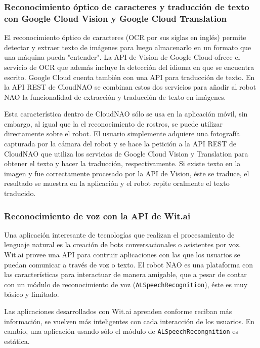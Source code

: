 \subsubsection{Reconocimiento óptico de caracteres y traducción de texto con Google Cloud Vision y Google Cloud Translation}

El reconocimiento óptico de caracteres (OCR por sus siglas en inglés) permite detectar y extraer texto de imágenes para luego
almacenarlo en un formato que una máquina pueda "entender".
La API de Vision de Google Cloud ofrece el servicio de OCR
que además incluye la detección del idioma en que se encuentra escrito.
Google Cloud cuenta también con una API para traducción de 
texto.
En la API REST de CloudNAO se combinan estos dos servicios
para añadir al robot NAO la funcionalidad de extracción y traducción de texto en imágenes. 

Esta característica dentro de CloudNAO sólo
se usa en la aplicación móvil, sin embargo, al igual que
la el reconocimiento de rostros, se puede utilizar directamente
sobre el robot. El usuario simplemente adquiere una fotografía
capturada por la cámara del robot y se hace la petición
a la API REST de CloudNAO que utiliza los servicios
de Google Cloud Vision y Translation para obtener el texto
y hacer la traducción, respectivamente.
Si existe texto en la imagen y fue correctamente procesado por
la API de Vision, éste se traduce, el resultado se muestra
en la aplicación y el robot repite oralmente
el texto traducido.

\subsubsection{Reconocimiento de voz con la API de Wit.ai}

Una aplicación interesante de tecnologías que realizan el 
procesamiento de lenguaje natural es la creación de bots conversacionales
o asistentes por voz. Wit.ai provee una API para contruir aplicaciones
con las que los usuarios se puedan comunicar a través de voz o texto.
El robot NAO es una plataforma con las características 
para interactuar de manera amigable, que a pesar de contar con un
módulo de reconocimiento de voz (\texttt{ALSpeechRecognition}), éste es muy 
básico y limitado.

Las aplicaciones desarrollados con Wit.ai aprenden conforme reciban más 
información, se vuelven más inteligentes con cada interacción de los usuarios.
En cambio, una aplicación usando sólo el módulo de \texttt{ALSpeechRecongnition} es estática.


